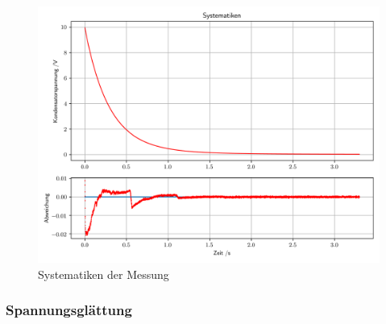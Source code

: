 \documentclass[12pt,twoside,a4paper]{scrartcl}
\begin{document}
			\begin{figure}[H]
				\centering
				\includegraphics[width = \textwidth]{Plots/Capacitor/CapacitorSystematiken}
				\caption{Systematiken der Messung}
			\end{figure}

		\subsubsection{Spannungsglättung}
		\label{Daten::Z}
\end{document}
